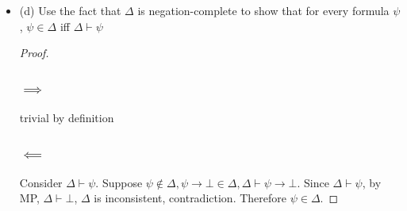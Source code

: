 \documentclass{article}
\begin{document}
\begin{itemize}
\begin{proof}
        \subsubsection*{$\impliedby$}
        Suppose otherwise, $\psi \rightarrow \bot \in \Delta, \psi \in \Delta, \Delta \vdash \psi, \Delta \vdash \psi \rightarrow \bot \implies \Delta$ is inconsistent, contradiction.
    \end{proof}
    \item (d) Use the fact that $\Delta$ is negation-complete to show that for every formula $\psi$, $\psi \in \Delta$ iff $\Delta \vdash \psi$
    \begin{proof}
        \subsubsection*{$\implies$}
        trivial by definition
        \subsubsection*{$\impliedby$}
        Consider $\Delta \vdash \psi$. Suppose $\psi \notin \Delta, \psi \rightarrow \bot \in \Delta, 
        \Delta \vdash \psi \rightarrow \bot$. 
        Since $\Delta \vdash \psi$, by MP, $\Delta \vdash \bot$, 
        $\Delta$ is inconsistent, contradiction. Therefore $\psi \in \Delta$.
        \end{proof}
\end{itemize}
\end{document}
